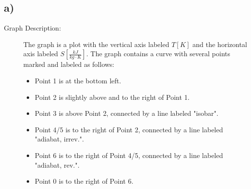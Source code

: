 

\subsection*{a)}

\begin{description}
    \item[Graph Description:] The graph is a plot with the vertical axis labeled \( T[K] \) and the horizontal axis labeled \( S \left[ \frac{kJ}{kg \cdot K} \right] \). The graph contains a curve with several points marked and labeled as follows:
    \begin{itemize}
        \item Point 1 is at the bottom left.
        \item Point 2 is slightly above and to the right of Point 1.
        \item Point 3 is above Point 2, connected by a line labeled "isobar".
        \item Point 4/5 is to the right of Point 2, connected by a line labeled "adiabat, irrev.".
        \item Point 6 is to the right of Point 4/5, connected by a line labeled "adiabat, rev.".
        \item Point 0 is to the right of Point 6.
    \end{itemize}
\end{description}